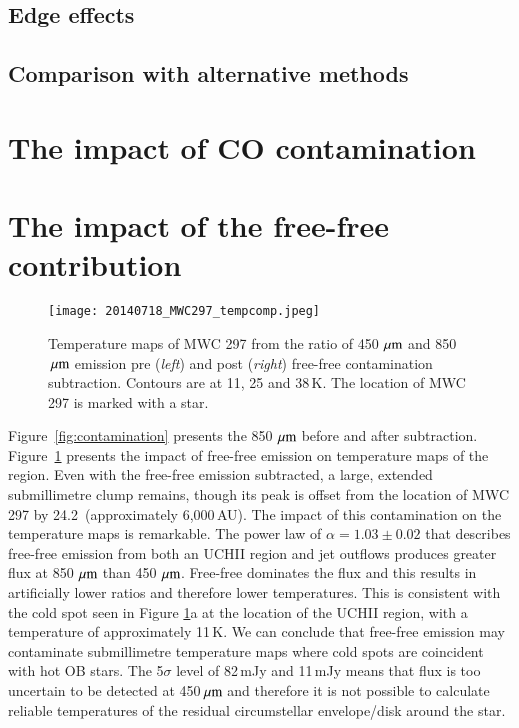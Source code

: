 \begin{figure(}
\subsection{Edge effects}
\subsection{Comparison with alternative methods}
\section{The impact of CO contamination}
\section{The impact of the free-free contribution}
\begin{figure*}
\begin{center}
\texttt{[image: 20140718\_MWC297\_tempcomp.jpeg]}
\caption{Temperature maps of MWC 297 from the ratio of 450\,$\,\mu\rm{m}$ and 850\,$\,\mu\rm{m}$ emission pre (\emph{left}) and post (\emph{right}) free-free 
contamination subtraction. Contours are at 11, 25 and 38\,K. The location of MWC 297 is marked with a star.}
\label{fig:Tcomp}
\end{center}
\end{figure*}
Figure~\ref{fig:contamination} presents the 850\,$\,\mu\rm{m}$ before and after subtraction. Figure~\ref{fig:Tcomp} presents the impact of free-free emission on temperature maps of the region. Even with the free-free emission subtracted, a large, extended submillimetre clump remains, though its peak is offset from the location of MWC 297 by 24.2\arcsec\ (approximately 6,000\,AU).
The impact of this contamination on the temperature maps is remarkable. The power law of $\alpha = 1.03\pm0.02$ that describes free-free emission from both an UCH\textrm{II} region and jet outflows produces greater flux at 850\,$\,\mu\rm{m}$ than 450\,$\,\mu\rm{m}$. Free-free dominates the flux and this results in artificially lower ratios and therefore lower temperatures. This is consistent with the cold spot seen in Figure \ref{fig:Tcomp}a at the location of the UCH\textrm{II} region, with a temperature of approximately 11\,K. We can conclude that free-free emission may contaminate submillimetre temperature maps where cold spots are coincident with hot OB stars.
The 5$\sigma$ level of 82\,mJy and 11\,mJy means that flux is too uncertain to be detected at 450$\,\mu\rm{m}$ and therefore it is not possible to calculate reliable temperatures of the residual circumstellar envelope/disk around the star. 

\end{figure(}
